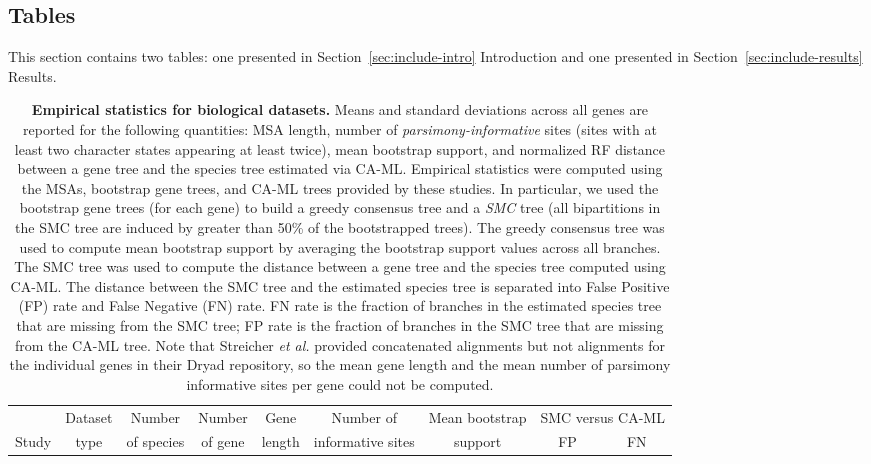 \begin{landscape}
\section{Tables}
\label{sec:include-tables}
This section contains two tables: one presented in Section~\ref{sec:include-intro} Introduction  and one presented in Section~\ref{sec:include-results} Results.

\vspace{12pt}

\begin{table}[!h]
\caption{{\bf Empirical statistics for biological datasets.} 
Means and standard deviations across all genes are reported for the following quantities: MSA length, number of \textit{\gls{parsimony-informative}} sites (sites with at least two character states appearing at least twice), mean bootstrap support, and normalized RF distance between a gene tree and the species tree estimated via CA-ML.
Empirical statistics were computed using the MSAs, bootstrap gene trees, and CA-ML trees provided by these studies. 
In particular, we used the bootstrap gene trees (for each gene) to build a greedy consensus tree and a \textit{\gls{SMC}} tree (all bipartitions in the SMC tree are induced by greater than 50\% of the bootstrapped trees).
The greedy consensus tree was used to compute mean bootstrap support by averaging the bootstrap support values across all branches. 
The SMC tree was used to compute the distance between a gene tree and the species tree computed using CA-ML. 
The distance between the SMC tree and the estimated species tree is separated into False Positive (FP) rate and False Negative (FN) rate. 
FN rate is the fraction of branches in the estimated species tree that are missing from the SMC tree; FP rate is the fraction of branches in the SMC tree that are missing from the CA-ML tree. 
Note that Streicher {\em et al.} \cite{streicher2016how} provided concatenated alignments but not alignments for the individual genes in their Dryad repository, so the mean gene length and the mean number of parsimony informative sites per gene could not be computed.
}\label{tab:include-1}
\centering
\small
\begin{tabular}{l cccc cc cc}
\toprule
& Dataset & Number & Number & Gene & Number of & Mean bootstrap & \multicolumn{2}{c}{SMC versus CA-ML}\\[0.5ex]
Study & type & of species & of gene & length & informative sites & support & FP & FN \\

\end{tabular}
\end{table}
\end{landscape}
